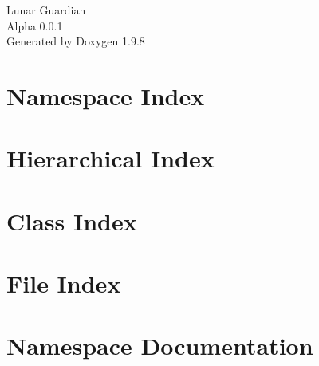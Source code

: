 \documentclass[twoside]{book}
\newcommand{\+}{\discretionary{\mbox{\scriptsize$\hookleftarrow$}}{}{}}
\newcommand{\clearemptydoublepage}{%
    \newpage{\pagestyle{empty}\cleardoublepage}%
  }
\begin{document}
  \raggedbottom
    \hypersetup{pageanchor=false,
                bookmarksnumbered=true,
                pdfencoding=unicode
               }
  \begin{titlepage}
  \vspace*{7cm}
  \begin{center}%
  {\Large Lunar Guardian}\\
  [1ex]\large Alpha 0.\+0.\+1 \\
  \vspace*{1cm}
  {\large Generated by Doxygen 1.9.8}\\
  \end{center}
  \end{titlepage}
  \clearemptydoublepage
  \tableofcontents
  \clearemptydoublepage
  \hypersetup{pageanchor=true}
\chapter{Namespace Index}

\chapter{Hierarchical Index}

\chapter{Class Index}

\chapter{File Index}

\chapter{Namespace Documentation}


















\end{document}
